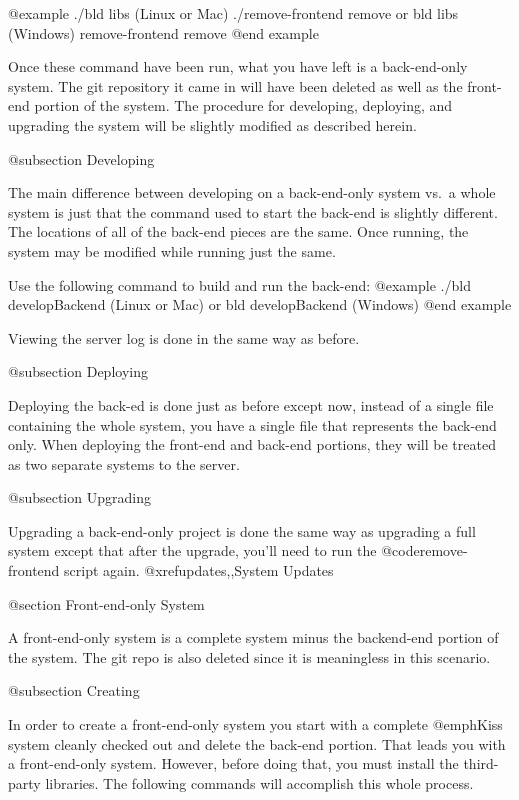 @example
./bld libs                   (Linux or Mac)
./remove-frontend remove
    or
bld libs                     (Windows)
remove-frontend remove
@end example

Once these command have been run, what you have left is a back-end-only system.  The git 
repository it came in will have been deleted as well as the front-end portion of the system.
The procedure for developing, deploying, and upgrading the system will be slightly modified as 
described herein.


@subsection Developing

The main difference between developing on a back-end-only system vs.\ a 
whole system is just that the command used to start the back-end is
slightly different.  The locations of all of the back-end pieces are
the same.  Once running, the system may be modified while running just
the same.

Use the following command to build and run the back-end:
@example
./bld developBackend         (Linux or Mac)
     or
bld developBackend           (Windows)
@end example

Viewing the server log is done in the same way as before.


@subsection Deploying

Deploying the back-ed is done just as before except now, instead of a single file containing the whole system, 
you have a single file that represents the back-end only.  When deploying the front-end and back-end portions,
they will be treated as two separate systems to the server.

@subsection Upgrading

Upgrading a back-end-only project is done the same way as upgrading a full system except that after the upgrade, you'll need to run the 
@code{remove-frontend} script again. @xref{updates,,System Updates}

@section Front-end-only System

A front-end-only system is a complete system minus the backend-end portion of the system.
The git repo is also deleted since it is meaningless in this scenario.

@subsection Creating

In order to create a front-end-only system you start with a complete
@emph{Kiss} system cleanly checked out and delete the back-end
portion.  That leads you with a front-end-only system.  However, before
doing that, you must install the third-party libraries.  The following
commands will accomplish this whole process.

